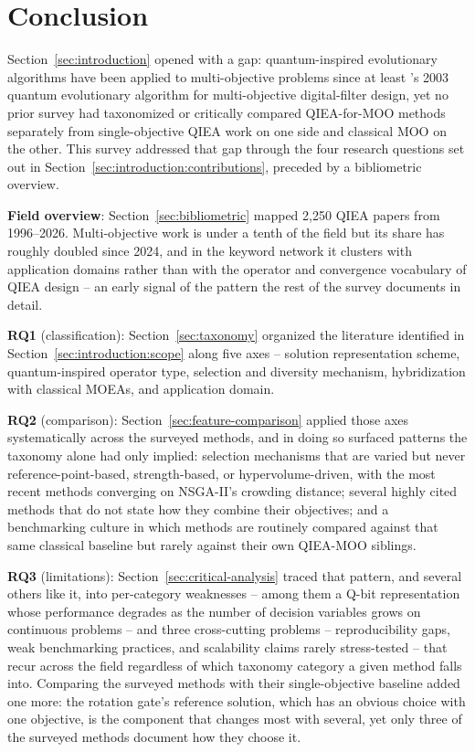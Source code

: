 \section{Conclusion}
\label{sec:conclusion}

Section~\ref{sec:introduction} opened with a gap: quantum-inspired
evolutionary algorithms have been applied to multi-objective problems
since at least \citet{zhang2003nqea}'s 2003 quantum evolutionary
algorithm for multi-objective digital-filter design, yet no prior survey had taxonomized or critically
compared QIEA-for-MOO methods separately from
single-objective QIEA work on one side and classical MOO on the other.
This survey addressed that gap through the four research questions set
out in Section~\ref{sec:introduction:contributions}, preceded by a
bibliometric overview.

\textbf{Field overview}: Section~\ref{sec:bibliometric} mapped 2{,}250
QIEA papers from 1996--2026. Multi-objective work is under a tenth of
the field but its share has roughly doubled since 2024, and in the
keyword network it clusters with application domains rather than with
the operator and convergence vocabulary of QIEA design -- an early
signal of the pattern the rest of the survey documents in detail.

\textbf{RQ1} (classification): Section~\ref{sec:taxonomy} organized the
literature identified in Section~\ref{sec:introduction:scope} along five
axes -- solution representation scheme, quantum-inspired operator type,
selection and diversity mechanism, hybridization with classical MOEAs,
and application domain.

\textbf{RQ2} (comparison): Section~\ref{sec:feature-comparison} applied
those axes systematically across the surveyed methods, and in doing so
surfaced patterns the taxonomy alone had only implied: selection
mechanisms that are varied but never reference-point-based,
strength-based, or hypervolume-driven, with the most recent methods
converging on NSGA-II's crowding distance; several highly cited methods
that do not state how they combine their objectives; and a benchmarking culture in which methods are routinely
compared against that same classical baseline but rarely against their
own QIEA-MOO siblings.

\textbf{RQ3} (limitations): Section~\ref{sec:critical-analysis} traced
that pattern, and several others like it, into per-category weaknesses
-- among them a Q-bit representation whose performance degrades as the
number of decision variables grows on continuous problems -- and three
cross-cutting problems -- reproducibility gaps, weak benchmarking
practices, and scalability claims rarely stress-tested -- that recur
across the field regardless of which taxonomy category a given method
falls into. Comparing the surveyed methods with their single-objective
baseline added one more: the rotation gate's reference solution, which
has an obvious choice with one objective, is the component that changes
most with several, yet only three of the surveyed methods
document how they choose it.

